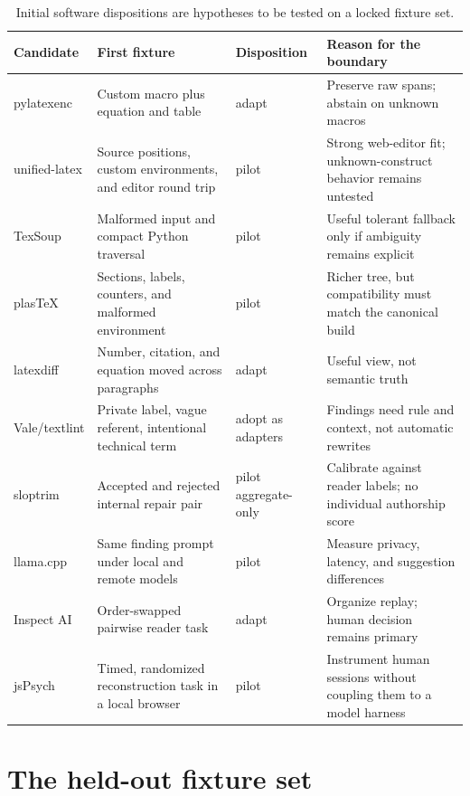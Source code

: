 \begin{table}[H]
\centering
\small
\begin{tabularx}{\textwidth}{@{}p{}p{}L p{0.22\textwidth}@{}}
\toprule
Candidate & First fixture & Disposition & Reason for
the boundary \\
\midrule
pylatexenc & Custom macro plus equation and table & adapt & Preserve raw spans;
abstain on unknown macros \\
unified-latex & Source positions, custom environments, and editor round trip &
pilot & Strong web-editor fit; unknown-construct behavior remains untested \\
TexSoup & Malformed input and compact Python traversal & pilot & Useful tolerant
fallback only if ambiguity remains explicit \\
plasTeX & Sections, labels, counters, and malformed environment & pilot &
Richer tree, but compatibility must match the canonical build \\
latexdiff & Number, citation, and equation moved across paragraphs & adapt &
Useful view, not semantic truth \\
Vale/textlint & Private label, vague referent, intentional technical term &
adopt as adapters & Findings need rule and context, not automatic rewrites \\
sloptrim & Accepted and rejected internal repair pair & pilot aggregate-only &
Calibrate against reader labels; no individual authorship score \\
llama.cpp & Same finding prompt under local and remote models & pilot & Measure
privacy, latency, and suggestion differences \\
Inspect AI & Order-swapped pairwise reader task & adapt & Organize replay; human
decision remains primary \\
jsPsych & Timed, randomized reconstruction task in a local browser & pilot &
Instrument human sessions without coupling them to a model harness \\
\bottomrule
\end{tabularx}
\caption{Initial software dispositions are hypotheses to be tested on a locked
fixture set.}
\label{tab:software-dispositions}
\end{table}

\section{The held-out fixture set}
\label{sec:software-fixtures}

